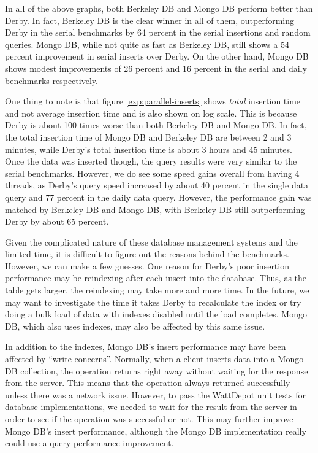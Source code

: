 \documentclass{sig-alternate}
\begin{document}
In all of the above graphs, both Berkeley DB and Mongo DB perform better than Derby.  In fact, Berkeley DB is the clear winner in all of them, outperforming Derby in the serial benchmarks by 64 percent in the serial insertions and random queries.  Mongo DB, while not quite as fast as Berkeley DB, still shows a 54 percent improvement in serial inserts over Derby.  On the other hand, Mongo DB shows modest improvements of 26 percent and 16 percent in the serial and daily benchmarks respectively.  

One thing to note is that figure \ref{exp:parallel-inserts} shows \emph{total} insertion time and not average insertion time and is also shown on log scale.  This is because Derby is about 100 times worse than both Berkeley DB and Mongo DB.  In fact, the total insertion time of Mongo DB and Berkeley DB are between 2 and 3 minutes, while Derby's total insertion time is about 3 hours and 45 minutes.  Once the data was inserted though, the query results were very similar to the serial benchmarks.  However, we do see some speed gains overall from having 4 threads, as Derby's query speed increased by about 40 percent in the single data query and 77 percent in the daily data query.  However, the performance gain was matched by Berkeley DB and Mongo DB, with Berkeley DB still outperforming Derby by about 65 percent.

Given the complicated nature of these database management systems and the limited time, it is difficult to figure out the reasons behind the benchmarks.  However, we can make a few guesses.  One reason for Derby's poor insertion performance may be reindexing after each insert into the database.  Thus, as the table gets larger, the reindexing may take more and more time.  In the future, we may want to investigate the time it takes Derby to recalculate the index or try doing a bulk load of data with indexes disabled until the load completes.  Mongo DB, which also uses indexes, may also be affected by this same issue.

In addition to the indexes, Mongo DB's insert performance may have been affected by ``write concerns''.  Normally, when a client inserts data into a Mongo DB collection, the operation returns right away without waiting for the response from the server.  This means that the operation always returned successfully unless there was a network issue.  However, to pass the WattDepot unit tests for database implementations, we needed to wait for the result from the server in order to see if the operation was successful or not.  This may further improve Mongo DB's insert performance, although the Mongo DB implementation really could use a query performance improvement.
\end{document}
